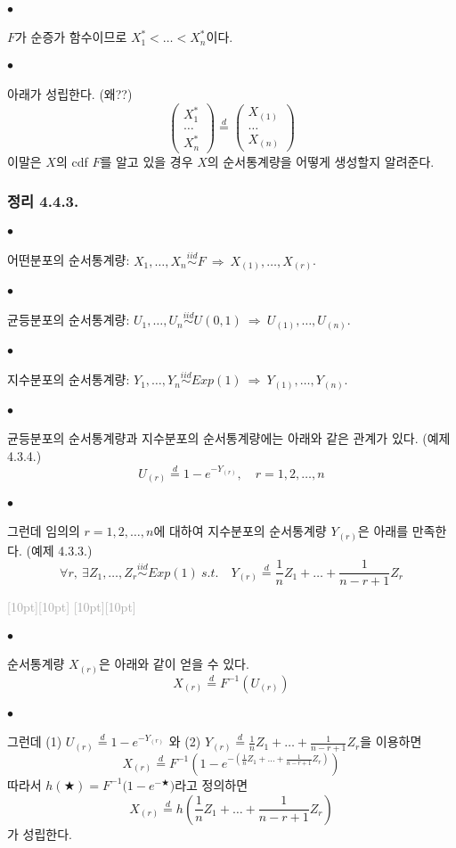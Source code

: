\documentclass[12pt,oneside,english]{book}
\newcommand{\rdash}{\noindent \textcolor{darkgray}{ \raisebox{-1.9pt}[10pt][10pt]{\leafright} \hrulefill \raisebox{-1.9pt}[10pt][10pt]{\leafright \decofourleft \decothreeleft  \aldineright \decotwo \floweroneleft \decoone}}}
\def\ck{\paragraph{\Large$\bullet$}\Large}
\begin{document}
\ck $F$가 순증가 함수이므로 $X_1^*<\dots<X_n^*$이다. 

\ck 아래가 성립한다. (왜??)
\[
\begin{pmatrix}
X_1^* \\ \dots \\ X_n^*
\end{pmatrix}\overset{d}{=}
\begin{pmatrix}
X_{(1)} \\ \dots \\ X_{(n)}
\end{pmatrix}
\]
이말은 $X$의 cdf $F$를 알고 있을 경우 $X$의 순서통계량을 어떻게 생성할지 알려준다. 

\subsubsection{정리 4.4.3.} 

\ck 어떤분포의 순서통계량: $X_1,\dots,X_n \overset{iid}{\sim} F ~ \Longrightarrow ~ X_{(1)},\dots,X_{(r)}$.
\ck 균등분포의 순서통계량: $U_1,\dots,U_n \overset{iid}{\sim} U(0,1) ~ \Longrightarrow ~ U_{(1)},\dots,U_{(n)}$. 

\ck 지수분포의 순서통계량: $Y_1,\dots,Y_n \overset{iid}{\sim} Exp(1) ~ \Longrightarrow ~ Y_{(1)},\dots,Y_{(n)}$. 

\ck 균등분포의 순서통계량과 지수분포의 순서통계량에는 아래와 같은 관계가 있다. (예제 4.3.4.)
\[
U_{(r)}\overset{d}{=}1-e^{-Y_{(r)}}, \quad r=1,2,\dots,n
\]

\ck 그런데 임의의 $r=1,2,\dots,n$에 대하여 지수분포의 순서통계량 $Y_{(r)}$은 아래를 만족한다. (예제 4.3.3.)
\[
\forall r,~  \exists Z_1,\dots,Z_r \overset{iid}{\sim} Exp(1) ~ s.t. \quad Y_{(r)}\overset{d}{=}\frac{1}{n}Z_1+\dots+\frac{1}{n-r+1}Z_r
\]

\rdash 

\ck 순서통계량 $X_{(r)}$은 아래와 같이 얻을 수 있다. 
\[
X_{(r)}\overset{d}{=}F^{-1}(U_{(r)})
\]
\ck 그런데 (1) $U_{(r)}\overset{d}{=}1-e^{-Y_{(r)}}$ 와 (2) $Y_{(r)}\overset{d}{=}\frac{1}{n}Z_1+\dots+\frac{1}{n-r+1}Z_r$을 이용하면 
\[
X_{(r)}\overset{d}{=}F^{-1}\left(1-e^{-(\frac{1}{n}Z_1+\dots+\frac{1}{n-r+1}Z_r)}\right)
\]
따라서 $h(\bigstar)=F^{-1}\big(1-e^{-\bigstar}\big)$라고 정의하면 
\[
X_{(r)}\overset{d}{=}h\left(\frac{1}{n}Z_1+\dots+\frac{1}{n-r+1}Z_r\right)
\]
가 성립한다. 
\end{document}
